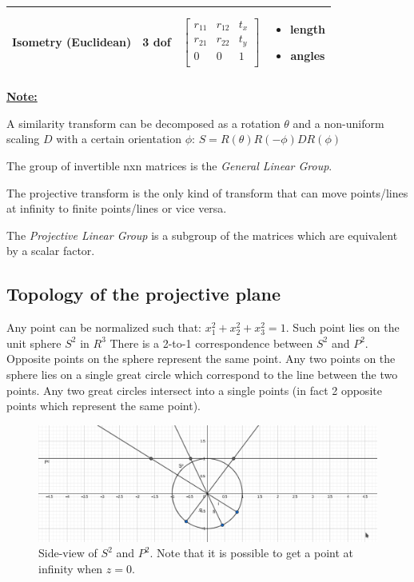 \begin{tabular}{|c|c|c|c|}
       Isometry (Euclidean) & 3 dof & 
  $\left[\begin{array}{ccc}
       r_{11}&r_{12}&t_{x}  \\
       r_{21}&r_{22}&t_{y}  \\
       0 & 0 & 1  \\
    \end{array}\right]$ & 
    \begin{minipage}[t]{0.4\textwidth}
    \begin{itemize}
        \item length
        \item angles
    \end{itemize}
    \end{minipage}
    \\
    \hline
\end{tabular}

\textbf{\underline{Note:}}

A similarity transform can be decomposed as a rotation $\theta$ and a non-uniform scaling $D$ with a certain orientation $\phi$:  $S = R(\theta)R(-\phi)DR(\phi)$

The group of invertible nxn matrices is the \textit{General Linear Group}.

The projective transform is the only kind of transform that can move points/lines at infinity to finite points/lines or vice versa.

The \textit{Projective Linear Group} is a subgroup of the matrices which are equivalent by a scalar factor.


\subsection{Topology of the projective plane}
Any point can be normalized such that: $x_1^2 + x_2^2 + x_3^2 = 1$.
Such point lies on the unit sphere $S^2$ in $R^3$
There is a 2-to-1 correspondence between $S^2$ and $P^2$.
Opposite points on the sphere represent the same point. Any two points on the sphere lies on a single great circle which correspond to the line between the two points. Any two great circles intersect into a single points (in fact 2 opposite points which represent the same point).

\begin{figure}
    \centering
    \includegraphics[scale=0.35]{content/Projective_plane.png}
    \caption{Side-view of $S^2$ and $P^2$. Note that it is possible to get a point at infinity when $z=0$.}
    \label{fig:projective_plane}
\end{figure}



